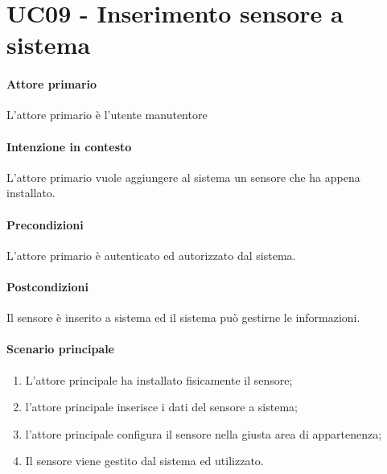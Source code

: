 \section{UC09 - Inserimento sensore a sistema}\label{uc:09}

\paragraph{Attore primario} L'attore primario è l'utente manutentore
\paragraph{Intenzione in contesto} L'attore primario vuole aggiungere al sistema un sensore che ha appena installato.

\paragraph{Precondizioni} L'attore primario è autenticato ed autorizzato dal sistema.

\paragraph{Postcondizioni} Il sensore è inserito a sistema ed il sistema può gestirne le informazioni.

\paragraph{Scenario principale}

\begin{enumerate}
    \item L'attore principale ha installato fisicamente il sensore;
    \item l'attore principale inserisce i dati del sensore a sistema;
    \item l'attore principale configura il sensore nella giusta area di appartenenza;
    \item Il sensore viene gestito dal sistema ed utilizzato.
\end{enumerate}
